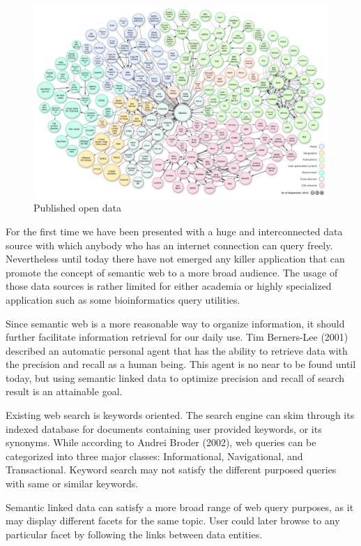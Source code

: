 \documentclass[12pt]{cls}
\begin{document}
\begin{figure}[ht!]
\centering
\includegraphics[width=\textwidth]{figures/opendata.jpeg}
\caption{Published open data}
\label{open data chart}
\end{figure}

For the first time we have been presented with a huge and interconnected data source with which anybody who has an internet connection can query freely. Nevertheless until today there have not emerged any killer application that can promote the concept of semantic web to a more broad audience. The usage of those data sources is rather limited for either academia or highly specialized application such as some bioinformatics query utilities.

Since semantic web is a more reasonable way to organize information, it should further facilitate information retrieval for our daily use. Tim Berners-Lee (2001) described an automatic personal agent that has the ability to retrieve data with the precision and recall as a human being. This agent is no near to be found until today, but using semantic linked data to optimize precision and recall of search result is an attainable goal.

Existing web search is keywords oriented. The search engine can skim through its indexed database for documents containing user provided keywords, or its synonyms. While according to Andrei Broder (2002), web queries can be categorized into three major classes: Informational, Navigational, and Transactional. Keyword search may not satisfy the different purposed queries with same or similar keywords.

Semantic linked data can satisfy a more broad range of web query purposes, as it may display different facets for the same topic. User could later browse to any particular facet by following the links between data entities.
\end{document}

